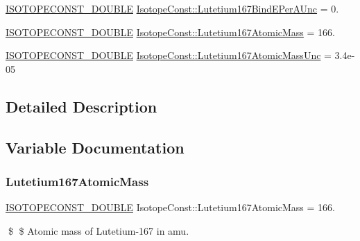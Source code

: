 \begin{DoxyCompactItemize}
\mbox{\hyperlink{group___isotope_const-_macros_ga8f45a7272ce02c0b4c65c44636ed719a}{I\+S\+O\+T\+O\+P\+E\+C\+O\+N\+S\+T\+\_\+\+D\+O\+U\+B\+LE}} \mbox{\hyperlink{group___isotope_const-_lutetium-_lu167_gaba2109d962c70cbddd8c43d7a1da5195}{Isotope\+Const\+::\+Lutetium167\+Bind\+E\+Per\+A\+Unc}} = 0.
\item 
\mbox{\hyperlink{group___isotope_const-_macros_ga8f45a7272ce02c0b4c65c44636ed719a}{I\+S\+O\+T\+O\+P\+E\+C\+O\+N\+S\+T\+\_\+\+D\+O\+U\+B\+LE}} \mbox{\hyperlink{group___isotope_const-_lutetium-_lu167_gad262f18c5ae096fa280fa00be0659369}{Isotope\+Const\+::\+Lutetium167\+Atomic\+Mass}} = 166.
\item 
\mbox{\hyperlink{group___isotope_const-_macros_ga8f45a7272ce02c0b4c65c44636ed719a}{I\+S\+O\+T\+O\+P\+E\+C\+O\+N\+S\+T\+\_\+\+D\+O\+U\+B\+LE}} \mbox{\hyperlink{group___isotope_const-_lutetium-_lu167_ga773670a30dedd924ad3dd9423a100936}{Isotope\+Const\+::\+Lutetium167\+Atomic\+Mass\+Unc}} = 3.\+4e-\/05
\end{DoxyCompactItemize}


\subsection{Detailed Description}


\subsection{Variable Documentation}
\mbox{\label{group___isotope_const-_lutetium-_lu167_gad262f18c5ae096fa280fa00be0659369}} 
\subsubsection{\texorpdfstring{Lutetium167\+Atomic\+Mass}{Lutetium167AtomicMass}}
{\footnotesize\ttfamily \mbox{\hyperlink{group___isotope_const-_macros_ga8f45a7272ce02c0b4c65c44636ed719a}{I\+S\+O\+T\+O\+P\+E\+C\+O\+N\+S\+T\+\_\+\+D\+O\+U\+B\+LE}} Isotope\+Const\+::\+Lutetium167\+Atomic\+Mass = 166.}

\$ \$ Atomic mass of Lutetium-\/167 in amu. \mbox{\label{group___isotope_const-_lutetium-_lu167_ga773670a30dedd924ad3dd9423a100936}} 
